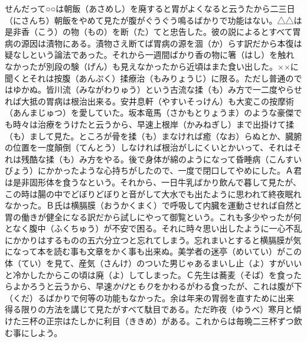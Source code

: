 せんだって○○は朝飯（あさめし）を廃すると胃がよくなると云うたから二三日（にさんち）朝飯をやめて見たが腹がぐうぐう鳴るばかりで功能はない。△△は是非香（こう）の物（もの）を断（た）てと忠告した。彼の説によるとすべて胃病の源因は漬物にある。漬物さえ断てば胃病の源を涸（か）らす訳だから本復は疑なしという論法であった。それから一週間ばかり香の物に箸（はし）を触れなかったが別段の験（げん）も見えなかったから近頃はまた食い出した。××に聞くとそれは按腹（あんぷく）揉療治（もみりょうじ）に限る。ただし普通のではゆかぬ。皆川流（みながわりゅう）という古流な揉（も）み方で一二度やらせれば大抵の胃病は根治出来る。安井息軒（やすいそっけん）も大変この按摩術（あんまじゅつ）を愛していた。坂本竜馬（さかもとりょうま）のような豪傑でも時々は治療をうけたと云うから、早速上根岸（かみねぎし）まで出掛けて揉（も）まして見た。ところが骨を揉（も）まなければ癒（なお）らぬとか、臓腑の位置を一度顛倒（てんとう）しなければ根治がしにくいとかいって、それはそれは残酷な揉（も）み方をやる。後で身体が綿のようになって昏睡病（こんすいびょう）にかかったような心持ちがしたので、一度で閉口してやめにした。Ａ君は是非固形体を食うなという。それから、一日牛乳ばかり飲んで暮して見たが、この時は腸の中でどぼりどぼりと音がして大水でも出たように思われて終夜眠れなかった。Ｂ氏は横膈膜（おうかくまく）で呼吸して内臓を運動させれば自然と胃の働きが健全になる訳だから試しにやって御覧という。これも多少やったが何となく腹中（ふくちゅう）が不安で困る。それに時々思い出したように一心不乱にかかりはするものの五六分立つと忘れてしまう。忘れまいとすると横膈膜が気になって本を読む事も文章をかく事も出来ぬ。美学者の迷亭（めいてい）がこの体（てい）を見て、産気（さんけ）のついた男じゃあるまいし止（よ）すがいいと冷かしたからこの頃は廃（よ）してしまった。Ｃ先生は蕎麦（そば）を食ったらよかろうと云うから、早速\emph{かけ}と\emph{もり}をかわるがわる食ったが、これは腹が下（くだ）るばかりで何等の功能もなかった。余は年来の胃弱を直すために出来得る限りの方法を講じて見たがすべて駄目である。ただ昨夜（ゆうべ）寒月と傾けた三杯の正宗はたしかに利目（ききめ）がある。これからは毎晩二三杯ずつ飲む事にしよう。\\


